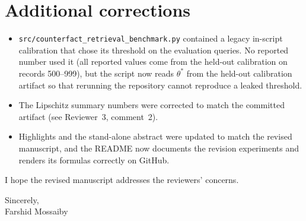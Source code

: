 \documentclass[11pt]{article}
\begin{document}
\section*{Additional corrections}
\begin{itemize}[leftmargin=*]
\item \texttt{src/counterfact\_retrieval\_benchmark.py} contained a legacy in-script calibration that chose its threshold on the evaluation queries. No reported number used it (all reported values come from the held-out calibration on records 500--999), but the script now reads $\theta^*$ from the held-out calibration artifact so that rerunning the repository cannot reproduce a leaked threshold.
\item The Lipschitz summary numbers were corrected to match the committed artifact (see Reviewer~3, comment~2).
\item Highlights and the stand-alone abstract were updated to match the revised manuscript, and the README now documents the revision experiments and renders its formulas correctly on GitHub.
\end{itemize}

I hope the revised manuscript addresses the reviewers' concerns.

Sincerely,\\
Farshid Mossaiby
\end{document}
